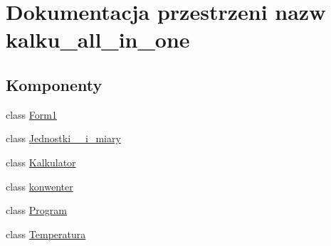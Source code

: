 \hypertarget{namespacekalku__all__in__one}{}\section{Dokumentacja przestrzeni nazw kalku\+\_\+all\+\_\+in\+\_\+one}
\label{namespacekalku__all__in__one}
\subsection*{Komponenty}
\begin{DoxyCompactItemize}
\item 
class \mbox{\hyperlink{classkalku__all__in__one_1_1_form1}{Form1}}
\item 
class \mbox{\hyperlink{classkalku__all__in__one_1_1_jednostki____i__miary}{Jednostki\+\_\+\+\_\+i\+\_\+miary}}
\item 
class \mbox{\hyperlink{classkalku__all__in__one_1_1_kalkulator}{Kalkulator}}
\item 
class \mbox{\hyperlink{classkalku__all__in__one_1_1konwenter}{konwenter}}
\item 
class \mbox{\hyperlink{classkalku__all__in__one_1_1_program}{Program}}
\item 
class \mbox{\hyperlink{classkalku__all__in__one_1_1_temperatura}{Temperatura}}
\end{DoxyCompactItemize}
